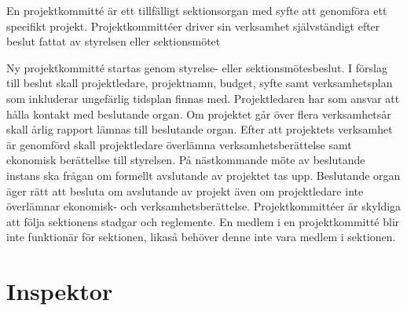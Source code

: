 \documentclass[stadgar]{dsekprotokoll}
\begin{document}
En projektkommitté är ett tillfälligt sektionsorgan med syfte att genomföra ett specifikt projekt. Projektkommittéer driver sin verksamhet självständigt efter beslut fattat av styrelsen eller sektionsmötet
\begin{stadgeavsnitt}
Ny projektkommitté startas genom styrelse- eller sektionsmötesbeslut. I förslag till beslut skall projektledare, projektnamn, budget, syfte samt verksamhetsplan som inkluderar ungefärlig tidsplan finnas med.
 Projektledaren har som ansvar att hålla kontakt med beslutande organ.
Om projektet går över flera verksamhetsår skall årlig rapport lämnas till beslutande organ.
Efter att projektets verksamhet är genomförd skall projektledare överlämna verksamhetsberättelse samt ekonomisk berättellse till styrelsen. På nästkommande möte av beslutande instans ska frågan om formellt avslutande av projektet tas upp. Beslutande organ äger rätt att besluta om avslutande av projekt även om projektledare inte överlämnar ekonomisk- och verksamhetsberättelse.
 Projektkommittéer är skyldiga att följa sektionens stadgar och reglemente.
En medlem i en projektkommitté blir inte funktionär för sektionen, likaså behöver denne inte vara medlem i sektionen.
\end{stadgeavsnitt}

\section{Inspektor}
\end{document}
